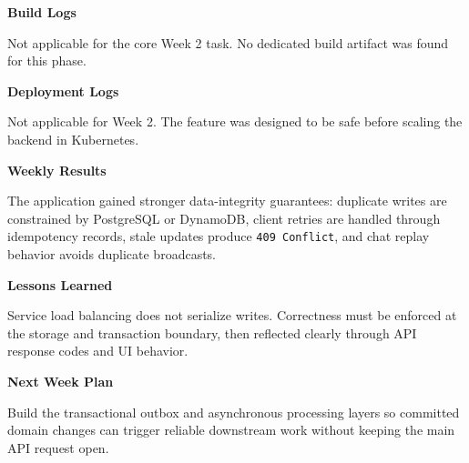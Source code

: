 \begin{Shaded}
\begin{Highlighting}[]
 
 
\end{Highlighting}
\end{Shaded}

\vspace{0.5em}\noindent\textbf{Build Logs}\par

Not applicable for the core Week 2 task. No dedicated build artifact was
found for this phase.

\vspace{0.5em}\noindent\textbf{Deployment Logs}\par

Not applicable for Week 2. The feature was designed to be safe before
scaling the backend in Kubernetes.

\vspace{0.5em}\noindent\textbf{Weekly Results}\par

The application gained stronger data-integrity guarantees: duplicate
writes are constrained by PostgreSQL or DynamoDB, client retries are
handled through idempotency records, stale updates produce
\texttt{409\ Conflict}, and chat replay behavior avoids duplicate
broadcasts.

\vspace{0.5em}\noindent\textbf{Lessons Learned}\par

Service load balancing does not serialize writes. Correctness must be
enforced at the storage and transaction boundary, then reflected clearly
through API response codes and UI behavior.

\vspace{0.5em}\noindent\textbf{Next Week Plan}\par

Build the transactional outbox and asynchronous processing layers so
committed domain changes can trigger reliable downstream work without
keeping the main API request open.
